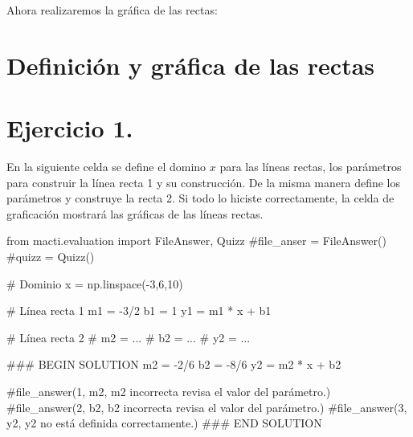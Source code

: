 \documentclass[
  letterpaper,
  DIV=11,
  numbers=noendperiod]{scrreprt}
\newenvironment{Shaded}{\begin{snugshade}}{\end{snugshade}}
\newcommand{\CommentTok}[1]{\textcolor[rgb]{0.37,0.37,0.37}{#1}}
\newcommand{\DecValTok}[1]{\textcolor[rgb]{0.68,0.00,0.00}{#1}}
\newcommand{\ImportTok}[1]{\textcolor[rgb]{0.00,0.46,0.62}{#1}}
\newcommand{\NormalTok}[1]{\textcolor[rgb]{0.00,0.23,0.31}{#1}}
\newcommand{\OperatorTok}[1]{\textcolor[rgb]{0.37,0.37,0.37}{#1}}
\newcommand{\RegionMarkerTok}[1]{\textcolor[rgb]{0.00,0.23,0.31}{#1}}
\begin{document}
Ahora realizaremos la gráfica de las rectas:

\section{Definición y gráfica de las
rectas}\label{definiciuxf3n-y-gruxe1fica-de-las-rectas}

\section{\texorpdfstring{\textbf{Ejercicio
1.}}{Ejercicio 1.}}\label{ejercicio-1.-5}

En la siguiente celda se define el domino \(x\) para las líneas rectas,
los parámetros para construir la línea recta 1 y su construcción. De la
misma manera define los parámetros y construye la recta 2. Si todo lo
hiciste correctamente, la celda de graficación mostrará las gráficas de
las líneas rectas.

\begin{Shaded}
\begin{Highlighting}[]
\ImportTok{from}\NormalTok{ macti.evaluation }\ImportTok{import}\NormalTok{ FileAnswer, Quizz}
\CommentTok{\#file\_anser = FileAnswer()}
\CommentTok{\#quizz = Quizz()}
\end{Highlighting}
\end{Shaded}

\begin{Shaded}
\begin{Highlighting}[]
\CommentTok{\# Dominio}
\NormalTok{x }\OperatorTok{=}\NormalTok{ np.linspace(}\OperatorTok{{-}}\DecValTok{3}\NormalTok{,}\DecValTok{6}\NormalTok{,}\DecValTok{10}\NormalTok{)}

\CommentTok{\# Línea recta 1}
\NormalTok{m1 }\OperatorTok{=} \OperatorTok{{-}}\DecValTok{3}\OperatorTok{/}\DecValTok{2}
\NormalTok{b1 }\OperatorTok{=} \DecValTok{1}
\NormalTok{y1 }\OperatorTok{=}\NormalTok{ m1 }\OperatorTok{*}\NormalTok{ x }\OperatorTok{+}\NormalTok{ b1}

\CommentTok{\# Línea recta 2}
\CommentTok{\# m2 = ...}
\CommentTok{\# b2 = ...}
\CommentTok{\# y2 = ...}

\CommentTok{\#\#\# }\RegionMarkerTok{BEGIN}\CommentTok{ SOLUTION}
\NormalTok{m2 }\OperatorTok{=} \OperatorTok{{-}}\DecValTok{2}\OperatorTok{/}\DecValTok{6}
\NormalTok{b2 }\OperatorTok{=} \OperatorTok{{-}}\DecValTok{8}\OperatorTok{/}\DecValTok{6}
\NormalTok{y2 }\OperatorTok{=}\NormalTok{ m2 }\OperatorTok{*}\NormalTok{ x }\OperatorTok{+}\NormalTok{ b2}

\CommentTok{\#file\_answer(\textquotesingle{}1\textquotesingle{}, m2, \textquotesingle{}m2 incorrecta revisa el valor del parámetro.\textquotesingle{})}
\CommentTok{\#file\_answer(\textquotesingle{}2\textquotesingle{}, b2, \textquotesingle{}b2 incorrecta revisa el valor del parámetro.\textquotesingle{})}
\CommentTok{\#file\_answer(\textquotesingle{}3\textquotesingle{}, y2, \textquotesingle{}y2 no está definida correctamente.\textquotesingle{})}
\CommentTok{\#\#\# }\RegionMarkerTok{END}\CommentTok{ SOLUTION}
\end{Highlighting}
\end{Shaded}
\end{document}
